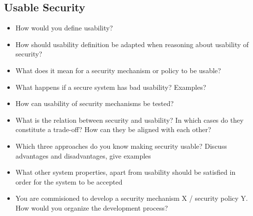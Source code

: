 \subsection{Usable Security}
\begin{itemize}
	\item
		How would you define usability?
	\item
		How should usability definition be adapted when reasoning about usability of security?
	\item
		What does it mean for a security mechanism or policy to be usable?
	\item
		What happens if a secure system has bad usability? Examples?
	\item
		How can usability of security mechanisms be tested?
	\item
		What is the relation between security and usability? In which cases do they constitute a trade-off? How can they be aligned with each other?
	\item
		Which three approaches do you know making security usable? Discuss advantages and disadvantages, give examples
	\item
		What other system properties, apart from usability should be satisfied in order for the system to be accepted
	\item
		You are commisioned to develop a security mechanism X / security policy Y. How would you organize the development process?
\end{itemize}

